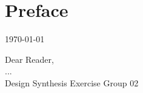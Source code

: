 \section*{Preface}\label{cha:preface}

\begin{flushright}
	\today
\end{flushright}

Dear Reader,	
\\ [1cm]
...
\\ [1.5cm]
Design Synthesis Exercise Group 02